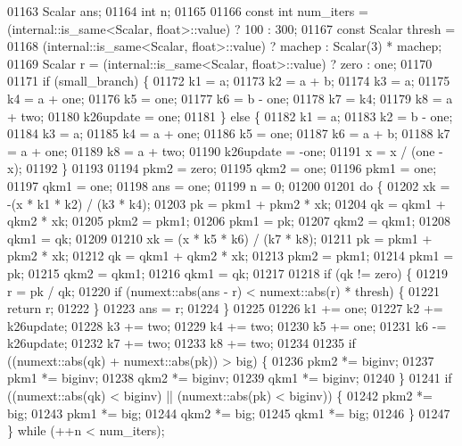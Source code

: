 \begin{DoxyCode}
01163     Scalar ans;
01164     \textcolor{keywordtype}{int} n;
01165 
01166     \textcolor{keyword}{const} \textcolor{keywordtype}{int} num\_iters = (internal::is\_same<Scalar, float>::value) ? 100 : 300;
01167     \textcolor{keyword}{const} Scalar thresh =
01168         (internal::is\_same<Scalar, float>::value) ? machep : Scalar(3) * machep;
01169     Scalar r = (internal::is\_same<Scalar, float>::value) ? zero : one;
01170 
01171     \textcolor{keywordflow}{if} (small\_branch) \{
01172       k1 = a;
01173       k2 = a + b;
01174       k3 = a;
01175       k4 = a + one;
01176       k5 = one;
01177       k6 = b - one;
01178       k7 = k4;
01179       k8 = a + two;
01180       k26update = one;
01181     \} \textcolor{keywordflow}{else} \{
01182       k1 = a;
01183       k2 = b - one;
01184       k3 = a;
01185       k4 = a + one;
01186       k5 = one;
01187       k6 = a + b;
01188       k7 = a + one;
01189       k8 = a + two;
01190       k26update = -one;
01191       x = x / (one - x);
01192     \}
01193 
01194     pkm2 = zero;
01195     qkm2 = one;
01196     pkm1 = one;
01197     qkm1 = one;
01198     ans = one;
01199     n = 0;
01200 
01201     \textcolor{keywordflow}{do} \{
01202       xk = -(x * k1 * k2) / (k3 * k4);
01203       pk = pkm1 + pkm2 * xk;
01204       qk = qkm1 + qkm2 * xk;
01205       pkm2 = pkm1;
01206       pkm1 = pk;
01207       qkm2 = qkm1;
01208       qkm1 = qk;
01209 
01210       xk = (x * k5 * k6) / (k7 * k8);
01211       pk = pkm1 + pkm2 * xk;
01212       qk = qkm1 + qkm2 * xk;
01213       pkm2 = pkm1;
01214       pkm1 = pk;
01215       qkm2 = qkm1;
01216       qkm1 = qk;
01217 
01218       \textcolor{keywordflow}{if} (qk != zero) \{
01219         r = pk / qk;
01220         \textcolor{keywordflow}{if} (numext::abs(ans - r) < numext::abs(r) * thresh) \{
01221           \textcolor{keywordflow}{return} r;
01222         \}
01223         ans = r;
01224       \}
01225 
01226       k1 += one;
01227       k2 += k26update;
01228       k3 += two;
01229       k4 += two;
01230       k5 += one;
01231       k6 -= k26update;
01232       k7 += two;
01233       k8 += two;
01234 
01235       \textcolor{keywordflow}{if} ((numext::abs(qk) + numext::abs(pk)) > big) \{
01236         pkm2 *= biginv;
01237         pkm1 *= biginv;
01238         qkm2 *= biginv;
01239         qkm1 *= biginv;
01240       \}
01241       \textcolor{keywordflow}{if} ((numext::abs(qk) < biginv) || (numext::abs(pk) < biginv)) \{
01242         pkm2 *= big;
01243         pkm1 *= big;
01244         qkm2 *= big;
01245         qkm1 *= big;
01246       \}
01247     \} \textcolor{keywordflow}{while} (++n < num\_iters);

\end{DoxyCode}
